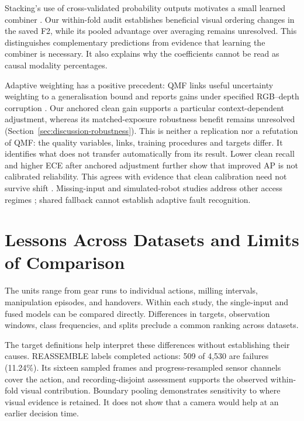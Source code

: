 Stacking's use of cross-validated probability outputs motivates a small learned combiner
\parencite{Ting1999Issues}. Our within-fold audit establishes beneficial visual ordering
changes in the saved F2, while its pooled advantage over averaging remains unresolved.
This distinguishes complementary predictions from evidence that learning the combiner is
necessary. It also explains why the coefficients cannot be read as causal modality
percentages.

Adaptive weighting has a positive precedent: QMF links useful uncertainty weighting to a
generalisation bound and reports gains under specified RGB--depth corruption
\parencite{Zhang2023QMF}. Our anchored clean gain supports a particular context-dependent
adjustment, whereas its matched-exposure robustness benefit remains unresolved
(Section~\ref{sec:discussion-robustness}). This is neither a replication
nor a refutation of QMF: the quality variables, links, training procedures and targets
differ. It identifies what does not transfer automatically from its result. Lower clean
recall and higher ECE after anchored adjustment further show that improved AP is not
calibrated reliability. This agrees with evidence that clean calibration need not
survive shift \parencite{P008}. Missing-input and simulated-robot studies address other
access regimes \parencite{P026,Altinses2023Fuzzy}; shared fallback cannot establish adaptive
fault recognition.

\section{Lessons Across Datasets and Limits of Comparison}
The units range from gear runs to individual actions, milling intervals, manipulation episodes, and
handovers. Within each study, the single-input and fused models can be compared
directly. Differences in targets, observation windows, class frequencies, and splits
preclude a common ranking across datasets.

The target definitions help interpret these differences without establishing their
causes. REASSEMBLE labels completed actions: 509 of 4,530 are failures (11.24\%). Its
sixteen sampled frames and progress-resampled sensor channels cover the action, and
recording-disjoint assessment supports the observed within-fold visual contribution.
Boundary pooling demonstrates sensitivity to where visual evidence is retained. It does
not show that a camera would help at an earlier decision time.

